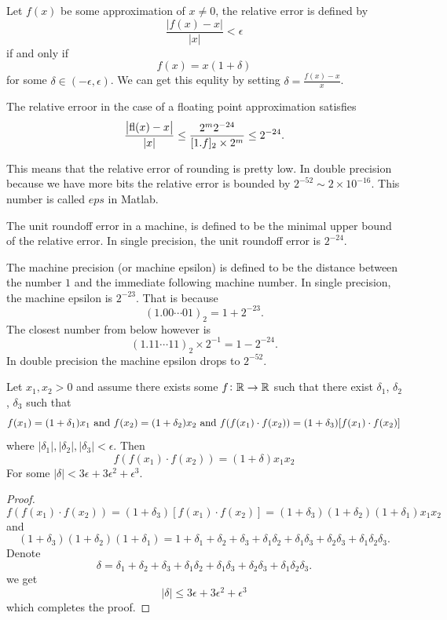 \documentclass[11pt,a4paper]{article}
\DeclareMathOperator{\fl}{fl}
\begin{document}
\begin{definition}
  Let $f(x)$ be some approximation of $x \neq 0$, the relative error
  is defined by
  \[
    \frac{|f(x) - x|}{|x|} < \epsilon
  \]
  if and only if
  \[
    f(x)= x(1 + \delta)
  \]
  for some $\delta \in (-\epsilon, \epsilon)$.
  We can get this equlity by setting $\delta = \frac{f(x) - x}{x}$.
\end{definition}

\begin{remark}
  The relative erroor in the case of a floating point approximation satisfies
  \[
    \frac{\abs{\fl(x) - x}}{|x|} \le
    \frac{2^m 2^{-24}}{[1.f]_2 \times 2^m} \le
    2^{-24}.
  \]
\end{remark}
This means that the relative error of rounding is pretty low.
In double precision because we have more bits the relative error
is bounded by $2^{-52} \sim 2 \times 10^{-16}$.
This number is called $eps$ in Matlab.

\begin{definition}
  The unit roundoff error in a machine, is defined to be the minimal upper bound
  of the relative error.
  In single precision, the unit roundoff error is $2^{-24}$.
\end{definition}

\begin{definition}
  The machine precision (or machine epsilon) is defined to be the distance
  between the number $1$ and the immediate following machine number.
  In single precision, the machine epsilon is $2^{-23}$.
  That is because
  \[
    (1.0 0 \cdots 0 1)_2 = 1 + 2^{-23}.
  \]
  The closest number from below however is
  \[
    (1.1 1 \cdots 1 1)_2 \times 2^{-1} = 1 - 2^{-24}.
  \]
  In double precision the machine epsilon drops to $2^{-52}$.
\end{definition}

\begin{proposition}
  Let $x_1,x_2 > 0$ and assume there exists some $f \colon \mathbb{R} \to \mathbb{R}$ such that
  there exist $\delta_1$, $\delta_2$, $\delta_3$ such that
  \[
    f(x_1) = (1 + \delta_1) x_1 \text{ and }
    f(x_2) = (1 + \delta_2) x_2 \text{ and }
    f(f(x_1) \cdot f(x_2)) = (1 + \delta_3)[f(x_1) \cdot f(x_2)]
  \]
  where $|\delta_1|, |\delta_2|, |\delta_3| < \epsilon$.
  Then
  \[
    f(f(x_1) \cdot f(x_2)) =
    (1 + \delta) x_1 x_2
  \]
  For some $|\delta| < 3 \epsilon + 3 \epsilon^2 + \epsilon^3$.
\end{proposition}
\begin{proof}
  \[
    f(f(x_1) \cdot f(x_2)) =
    (1 + \delta_3)[f(x_1) \cdot f(x_2)] =
    (1 + \delta_3)(1 + \delta_2)(1 + \delta_1) x_1 x_2
  \]
  and
  \[
    (1 + \delta_3)(1 + \delta_2)(1 + \delta_1) =
    1 + \delta_1 + \delta_2 + \delta_3 + 
    \delta_1 \delta_2 + \delta_1 \delta_3 + \delta_2 \delta_3 + 
    \delta_1 \delta_2 \delta_3.
  \]
  Denote
  \[
    \delta =
    \delta_1 + \delta_2 + \delta_3 + 
    \delta_1 \delta_2 + \delta_1 \delta_3 + \delta_2 \delta_3 + 
    \delta_1 \delta_2 \delta_3.
  \]
  we get
  \[
    |\delta| \le 3 \epsilon + 3 \epsilon^2 + \epsilon^3
  \]
  which completes the proof.
\end{proof}
\end{document}
